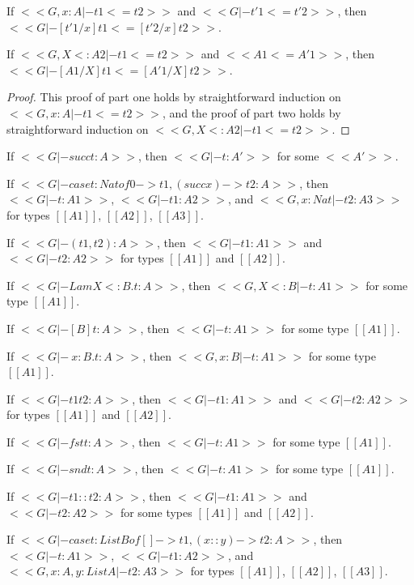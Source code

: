 \begin{lemma}
  \label{lemma:substitution_for_term_precision}
  \begin{enumR}
  \item If $<<G, x : A |- t1 <= t2>>$ and $<<G |- t'1 <= t'2>>$, then $<<G |- [t'1/x]t1 <= [t'2/x]t2>>$.
  \item If $<<G, X <: A2 |- t1 <= t2>>$ and $<<A1 <= A'1>>$, then $<<G |- [A1/X]t1 <= [A'1/X]t2>>$.
  \end{enumR}
\end{lemma}
\begin{proof}
  This proof of part one holds by straightforward induction on $<<G, x : A |- t1 <= t2>>$, and the
  proof of part two holds by straightforward induction on $<<G, X <: A2 |- t1 <= t2>>$.
\end{proof}

\begin{lemma}
  \label{lemma:typeability_inversion}
  \begin{enumR}
  \item If $<<G |- succ t : A>>$, then $<<G |- t : A'>>$ for some $<<A'>>$.
  \item If $<<G |- case t : Nat of 0 -> t1, (succ x) -> t2 : A>>$, then $<<G |- t : A1>>$, $<<G |- t1 : A2>>$,
    and $<<G,x : Nat |- t2 : A3>>$ for types $[[A1]]$, $[[A2]]$, $[[A3]]$.
  \item If $<<G |- (t1, t2) : A>>$, then $<<G |- t1 : A1>>$ and  $<<G |- t2 : A2>>$ for types $[[A1]]$ and $[[A2]]$.
  \item If $<<G |- Lam X <: B . t : A>>$, then $<<G, X <: B |- t : A1>>$ for some type $[[A1]]$.
  \item If $<<G |- [B]t : A>>$, then $<<G |- t : A1>>$ for some type $[[A1]]$.
  \item If $<<G |- \ x : B . t : A>>$, then $<<G, x : B |- t : A1>>$ for some type $[[A1]]$.
  \item If $<<G |- t1 t2 : A>>$, then $<<G |- t1 : A1>>$ and  $<<G |- t2 : A2>>$ for types $[[A1]]$ and $[[A2]]$.
  \item If $<<G |- fst t : A>>$, then $<<G |- t : A1>>$ for some type $[[A1]]$.
  \item If $<<G |- snd t : A>>$, then $<<G |- t : A1>>$ for some type $[[A1]]$.
  \item If $<<G |- t1 :: t2 : A>>$, then $<<G |- t1 : A1>>$ and $<<G |- t2 : A2>>$ for some types $[[A1]]$ and $[[A2]]$.
  \item If $<<G |- case t : List B of [] -> t1, (x::y) -> t2 : A>>$, then $<<G |- t : A1>>$, $<<G |- t1 : A2>>$,
    and $<<G,x : A, y : List A |- t2 : A3>>$ for types $[[A1]]$, $[[A2]]$, $[[A3]]$.
    
  \end{enumR}
\end{lemma}



